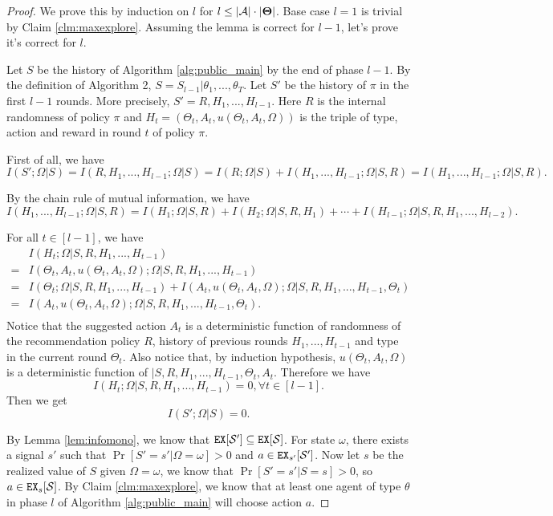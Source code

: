 \begin{proof}
We prove this by induction on $l$ for $l \leq |\mathcal{A}|\cdot |\bold{\Theta}|$. Base case $l=1$ is trivial by Claim \ref{clm:maxexplore}. Assuming the lemma is correct for $l-1$, let's prove it's correct for $l$.

Let $S$ be the history of Algorithm \ref{alg:public_main} by the end of phase $l-1$. By the definition of Algorithm 2, $S = S_{l-1} | \theta_1,...,\theta_T$.  Let $S'$ be the history of $\pi$ in the first $l-1$ rounds. More precisely, $S' = R, H_1,...,H_{l-1}$. Here $R$ is the internal randomness of policy $\pi$ and $H_t = (\Theta_t, A_t, u(\Theta_t, A_t, \Omega))$ is the triple of type, action and reward in round $t$ of policy $\pi$.

First of all, we have
\[
I(S'; \Omega| S) = I(R,H_1,...,H_{l-1}; \Omega| S)  = I(R; \Omega| S) + I(H_1,...,H_{l-1}; \Omega|S, R) = I(H_1,...,H_{l-1}; \Omega|S, R).
\]

By the chain rule of mutual information, we have
\[
 I(H_1,...,H_{l-1}; \Omega|S, R) = I(H_1;\Omega|S,R) + I(H_2;\Omega|S, R ,H_1) + \cdots + I(H_{l-1}; \Omega|S,R,H_1,...,H_{l-2}).
\]

For all $t \in [l-1]$, we have
\begin{align*}
&I(H_t; \Omega|S,R,H_1,...,H_{t-1}) \\
=& I(\Theta_t, A_t, u(\Theta_t, A_t, \Omega); \Omega|S,R,H_1,...,H_{t-1}) \\
=& I(\Theta_t ; \Omega|S,R,H_1,...,H_{t-1}) +  I(A_t, u(\Theta_t, A_t, \Omega); \Omega|S,R,H_1,...,H_{t-1},\Theta_t) \\
=& I(A_t, u(\Theta_t, A_t, \Omega); \Omega|S,R,H_1,...,H_{t-1},\Theta_t). \\
\end{align*}
Notice that the suggested action $A_t$ is a deterministic function of randomness of the recommendation policy $R$,  history of previous rounds $H_1,...,H_{t-1}$ and type in the current round $\Theta_t$. Also notice that, by induction hypothesis, $u(\Theta_t, A_t, \Omega)$ is a deterministic function of $|S,R,H_1,...,H_{t-1},\Theta_t, A_t$. Therefore we have
\[
I(H_t; \Omega|S,R,H_1,...,H_{t-1}) = 0, \forall t \in [l-1].
\]
Then we get
\[
I(S'; \Omega | S) = 0.
\]

By Lemma \ref{lem:infomono}, we know that $\mathtt{EX}[\mathcal{S}'] \subseteq \mathtt{EX}[\mathcal{S}]$. For state $\omega$, there exists a signal $s'$ such that $\Pr[S'=s'|\Omega =\omega] >0 $ and $a \in \mathtt{EX}_{s'} [\mathcal{S}']$. Now let $s$ be the realized value of $S$ given $\Omega = \omega$, we know that $\Pr[S'=s'|S=s] >0$, so $a \in \mathtt{EX}_s[\mathcal{S}]$. By Claim \ref{clm:maxexplore}, we know that at least one agent of type $\theta$ in phase $l$ of Algorithm \ref{alg:public_main} will choose action $a$.


\end{proof}
